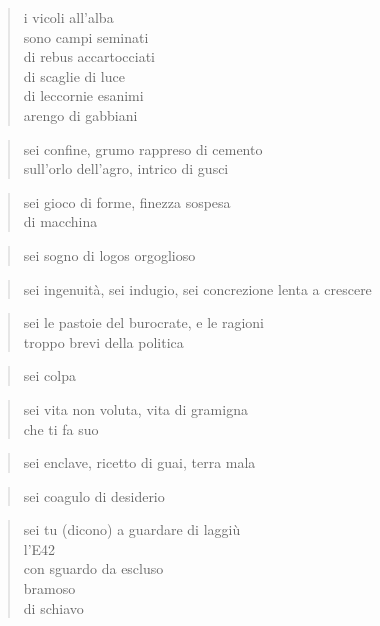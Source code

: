 \begin{verse}
    i vicoli all'alba\\
    sono campi seminati\\
    di rebus accartocciati\\
    di scaglie di luce\\
    di leccornie esanimi\\
    arengo di gabbiani
\end{verse}

\clearpage


\begin{verse}
    sei confine, grumo rappreso di cemento\\
    sull'orlo dell'agro, intrico di gusci
\end{verse}

\begin{verse}
    sei gioco di forme, finezza sospesa\\
    di macchina
\end{verse}

\begin{verse}
    sei sogno di logos orgoglioso
\end{verse}

\begin{verse}
    sei ingenuità, sei indugio, sei concrezione
    lenta a crescere
\end{verse}

\begin{verse}
    sei le pastoie del burocrate, e le ragioni\\
    troppo brevi della politica
\end{verse}

\begin{verse}
    sei colpa
\end{verse}

\begin{verse}
    sei vita non voluta, vita di gramigna\\
    che ti fa suo
\end{verse}

\begin{verse}
    sei enclave, ricetto di guai, terra mala
\end{verse}

\begin{verse}
    sei coagulo di desiderio
\end{verse}

\begin{verse}
    sei tu (dicono) a guardare di laggiù\\
    l'E42\\
    con sguardo da escluso\\
    bramoso\\
    di schiavo
\end{verse}

